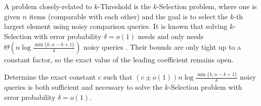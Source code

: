 A problem closely-related to $k$-Threshold is the $k$-Selection problem, where one is given $n$ items (comparable with each other) and the goal is to select the $k$-th largest element using noisy comparison queries. It is known that solving $k$-Selection with error probability $\delta=o(1)$ needs and only needs $\Theta\left(n\log \frac {\min\{k,n-k+1\}}\delta\right)$ noisy queries \cite{feige1994computing}.
Their bounds are only tight up to a constant factor, so the exact value of the leading coefficient remains open.
\begin{open} \label{open:k-selection}
  Determine the exact constant $c$ such that $(c\pm o(1)) n\log \frac {\min\{k,n-k+1\}}{\delta}$ noisy queries is both sufficient and necessary to solve the $k$-Selection problem with error probability $\delta=o(1)$.
\end{open}
